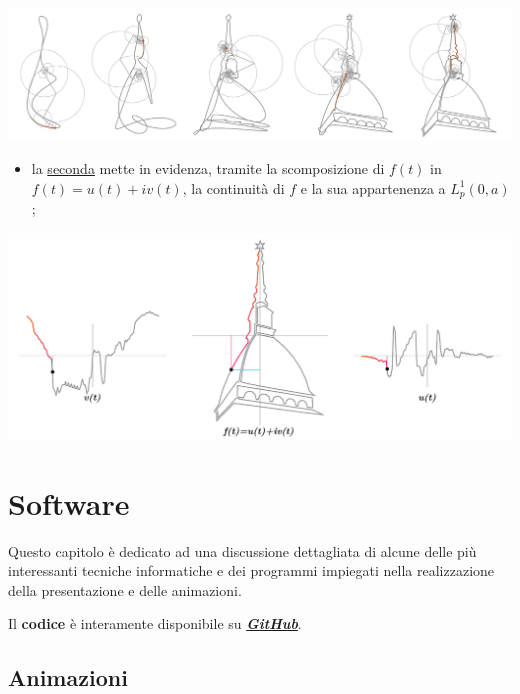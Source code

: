 \documentclass[
]{book}
\providecommand{\tightlist}{%
  \setlength{\itemsep}{0pt}\setlength{\parskip}{0pt}}
\begin{document}
\begin{center}\includegraphics[width=1\linewidth]{_images/serie-fourier} \end{center}

\begin{itemize}
\tightlist
\item
  la \href{https://bradwave.github.io/thesis/\#/scomposizione}{seconda} mette in evidenza, tramite la scomposizione di \(f(t)\) in \(f(t)=u(t)+iv(t)\), la continuità di \(f\) e la sua appartenenza a \(L^1_p(0,a)\);
\end{itemize}

\begin{center}\includegraphics[width=1\linewidth]{_images/decomp} \end{center}

\hypertarget{software}{%
\chapter{Software}\label{software}}

Questo capitolo è dedicato ad una discussione dettagliata di alcune delle più interessanti tecniche informatiche e dei programmi impiegati nella realizzazione della presentazione e delle animazioni.

Il \textbf{codice} è interamente disponibile su \href{https://github.com/Bradwave/thesis}{\emph{\textbf{GitHub}}}.

\hypertarget{softan}{%
\section{Animazioni}\label{softan}}
\end{document}
